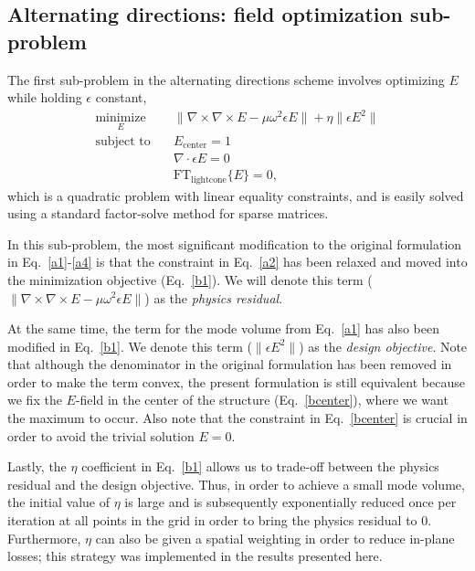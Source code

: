 \subsection{Alternating directions: field optimization sub-problem}
The first sub-problem in the alternating directions scheme involves optimizing $E$ while holding $\epsilon$ constant,
\begin{align}
\underset{E}{\text{minimize}} \quad& \|\nabla\times\nabla\times E - \mu\omega^2\epsilon E\|
    + \eta \|\epsilon E^2\| \label{b1}\\ 
\text{subject to} \quad 
    & E_\text{center} = 1 \label{bcenter} \\
    & \nabla\cdot\epsilon E = 0 \label{bdiv}\\
    & \text{FT}_\text{lightcone}\{E\} = 0, \label{bQ}
\end{align}
which is a quadratic problem with linear equality constraints, and is easily solved using a standard factor-solve method for sparse matrices\cite{cholmod}.

In this sub-problem, the most significant modification to the original formulation in Eq.~\ref{a1}-\ref{a4} is that the constraint in Eq.~\ref{a2} has been relaxed and moved into the minimization objective (Eq.~\ref{b1}). We will denote this term ($\|\nabla\times\nabla\times E - \mu\omega^2\epsilon E\|$) as the \emph{physics residual}. 

At the same time, the term for the mode volume from Eq.~\ref{a1} has also been modified in Eq.~\ref{b1}. We denote this term ($\|\epsilon E^2\|$) as the \emph{design objective}. Note that although the denominator in the original formulation has been removed in order to make the term convex, the present formulation is still equivalent because we fix the $E$-field in the center of the structure (Eq.~\ref{bcenter}), where we want the maximum to occur. Also note that the constraint in Eq.~\ref{bcenter} is crucial in order to avoid the trivial solution $E=0$.

Lastly, the $\eta$ coefficient in Eq.~\ref{b1} allows us to trade-off between the physics residual and the design objective. Thus, in order to achieve a small mode volume, the initial value of $\eta$ is large and is subsequently exponentially reduced once per iteration at all points in the grid in order to bring the physics residual to 0. Furthermore, $\eta$ can also be given a spatial weighting in order to reduce in-plane losses; this strategy was implemented in the results presented here.


